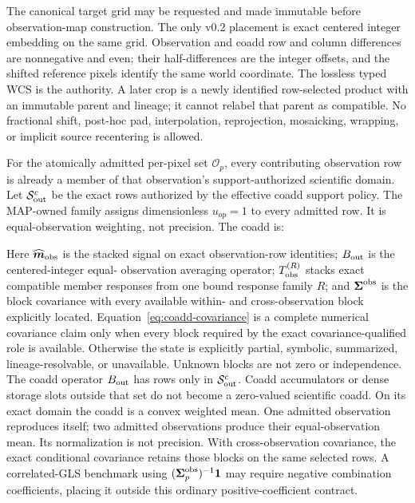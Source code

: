 \documentclass[10pt]{article}
\begin{document}
\SCIMapProductRoleDefinition

\SCIMapProductRoleDependencyTable

The canonical target grid may be requested and made immutable before
observation-map construction. The only v0.2 placement is exact centered
integer embedding on the same grid.
Observation and coadd row and column differences are nonnegative and even;
their half-differences are the integer offsets, and the shifted reference
pixels identify the same world coordinate. The lossless typed WCS is the
authority. A later crop is a newly identified row-selected product with an
immutable parent and lineage; it cannot relabel that parent as compatible. No
fractional shift, post-hoc pad, interpolation, reprojection, mosaicking,
wrapping, or implicit source recentering is allowed.

For the atomically admitted per-pixel set \(\mathcal O_p\), every contributing
observation row is already a member of that observation's support-authorized
scientific domain. Let \(\mathcal S^c_{\rm out}\) be the exact rows authorized
by the effective coadd support policy. The MAP-owned family
\SCIMapUniformCoaddProfile{} assigns dimensionless
\(u_{op}=1\) to every admitted row. It is equal-observation weighting, not
precision. The coadd is:

\SCIMapCoaddEquations

Here \(\widehat{\boldsymbol m}_{\rm obs}\) is the stacked signal on exact
observation-row identities; \(B_{\rm out}\) is the centered-integer equal-
observation averaging operator; \(T_{\rm obs}^{(R)}\) stacks exact compatible
member responses from one bound response family \(R\); and \(\boldsymbol\Sigma^{\rm obs}\)
is the block covariance with
every available within- and cross-observation block explicitly located.
Equation~\eqref{eq:coadd-covariance} is a complete numerical covariance claim
only when every block required by the exact covariance-qualified role is
available. Otherwise the state is explicitly partial, symbolic, summarized,
lineage-resolvable, or unavailable. Unknown blocks are not zero or
independence. The coadd operator \(B_{\rm out}\) has rows only in
\(\mathcal S^c_{\rm out}\). Coadd accumulators or dense storage slots outside
that set do not become a zero-valued scientific coadd. On its exact domain the
coadd is a convex weighted mean. One admitted observation reproduces itself;
two admitted observations produce their equal-observation mean. Its
normalization is not precision. With cross-observation covariance, the exact
conditional covariance retains those blocks on the same selected rows. A
correlated-GLS benchmark using
\((\boldsymbol\Sigma^{\rm obs}_p)^{-1}\boldsymbol 1\) may require negative combination coefficients,
placing it outside this ordinary positive-coefficient contract.
\end{document}
